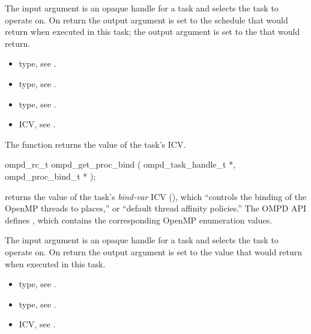 \argdesc
The input argument  is an opaque handle for a task and selects the task to operate on.
On return the output argument  is set to the schedule that  would return when
executed in this task; the output argument  is set to the  that 
 would return.


\crossreferences
\begin{itemize}
	\item {} type, see .
	\item {} type, see .
	\item {} type, see .
	\item {} ICV, see .
\end{itemize}


%
\label{subsubsubsec:ompd_get_proc_bind}
\summary
The  function returns the value of the task's  ICV.

\format
\begin{cspecific}
\begin{ompSyntax}
ompd_rc_t ompd_get_proc_bind (
  ompd_task_handle_t *,
  ompd_proc_bind_t *
);
\end{ompSyntax}
\end{cspecific}

\descr
{} returns the value of the task's
\emph{bind-var} ICV (), which ``controls the
binding of the OpenMP threads to places,'' or ``default thread
affinity policies.''
%
The OMPD API defines
, which
contains the corresponding OpenMP enumeration values.
%

\argdesc
The input argument  is an opaque handle for a task and selects the task to operate on.
On return the output argument  is set to the value that  would return when
executed in this task.
%

\crossreferences
\begin{itemize}
	\item {} type, see .
	\item {} type, see .
	\item {} ICV, see .
\end{itemize}

